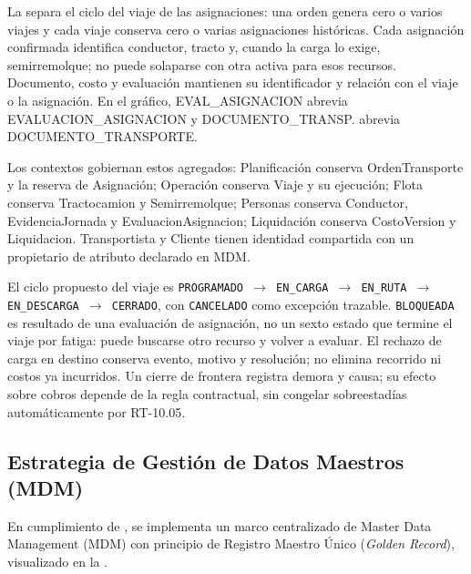 La  separa el ciclo del viaje de las asignaciones: una orden genera cero o varios viajes y cada viaje conserva cero o varias asignaciones históricas. Cada asignación confirmada identifica conductor, tracto y, cuando la carga lo exige, semirremolque; no puede solaparse con otra activa para esos recursos. Documento, costo y evaluación mantienen su identificador y relación con el viaje o la asignación. En el gráfico, EVAL\_\allowbreak{}ASIGNACION abrevia EVALUACION\_\allowbreak{}ASIGNACION y DOCUMENTO\_\allowbreak{}TRANSP. abrevia DOCUMENTO\_\allowbreak{}TRANSPORTE.

Los contextos gobiernan estos agregados: Planificación conserva OrdenTransporte y la reserva de Asignación; Operación conserva Viaje y su ejecución; Flota conserva Tractocamion y Semirremolque; Personas conserva Conductor, EvidenciaJornada y EvaluacionAsignacion; Liquidación conserva CostoVersion y Liquidacion. Transportista y Cliente tienen identidad compartida con un propietario de atributo declarado en MDM.

El ciclo propuesto del viaje es \texttt{PROGRAMADO $\rightarrow$ EN\_\allowbreak{}CARGA $\rightarrow$ EN\_\allowbreak{}RUTA $\rightarrow$ EN\_\allowbreak{}DESCARGA $\rightarrow$ CERRADO}, con \texttt{CANCELADO} como excepción trazable. \texttt{BLOQUEADA} es resultado de una evaluación de asignación, no un sexto estado que termine el viaje por fatiga: puede buscarse otro recurso y volver a evaluar. El rechazo de carga en destino conserva evento, motivo y resolución; no elimina recorrido ni costos ya incurridos. Un cierre de frontera registra demora y causa; su efecto sobre cobros depende de la regla contractual, sin congelar sobreestadías automáticamente por RT-10.05.

\FloatBarrier
\subsection{Estrategia de Gestión de Datos Maestros (MDM)}\label{sec:5-mdm}\label{sec:05-estrategia-de-gestion-de-datos-maestros-mdm}

En cumplimiento de , se implementa un marco centralizado de Master Data Management (MDM) con principio de Registro Maestro Único (\emph{Golden Record}), visualizado en la .



